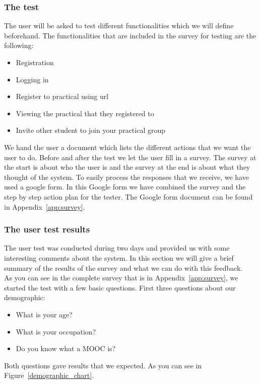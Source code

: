 \subsubsection{The test}
The user will be asked to test different functionalities which we will define beforehand.
The functionalities that are included in the survey for testing are the following:
\begin{itemize}
\item Registration
\item Logging in
\item Register to practical using url
\item Viewing the practical that they registered to
\item Invite other student to join your practical group
\end{itemize}
We hand the user a document which lists the different actions that we want the user to do.
Before and after the test we let the user fill in a survey.
The survey at the start is about who the user is and the survey at the end is about what they thought of the system.
To easily process the responses that we receive, we have used a google form.
In this Google form we have combined the survey and the step by step action plan for the tester.
The Google form document can be found in Appendix~\ref{app:survey}.

\subsubsection{The user test results}
The user test was conducted during two days and provided us with some interesting comments about the system.
In this section we will give a brief summary of the results of the survey and what we can do with this feedback.\\

As you can see in the complete survey that is in Appendix~\ref{app:survey}, we started the test with a few basic questions.
First three questions about our demographic:
\begin{itemize}
\item What is your age?
\item What is your occupation?
\item Do you know what a MOOC is?
\end{itemize}

Both questions gave results that we expected.
As you can see in Figure~\ref{demographic_chart}.

